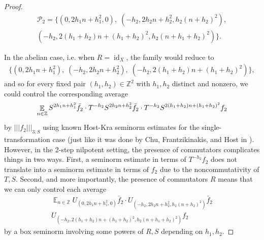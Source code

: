 \documentclass[11pt]{amsart}
\theoremstyle{definition}
\DeclareMathOperator*{\E}{\mathbb{E}}
\newcommand{\Z}{{\mathbb Z}}
\newcommand{\CP}{{\mathcal P}}
\newcommand{\nnorm}[1]{\lvert\!|\!| #1|\!|\!\rvert}
\newcommand{\1}{{\mathbf{1}}}
\DeclareMathOperator{\Id}{id}
\begin{document}
\begin{proof}
    \begin{multline*}
        \CP_2 = \{(0, 2h_1 n +h_1^2,0),\; (-h_2,2h_2 n +h_2^2,h_2(n+h_2)^2),\\ (-h_2, 2(h_1+h_2) n +(h_1+h_2)^2, h_2(n+h_1+h_2)^2)\}.
    \end{multline*}

    In the abelian case, i.e. when $R=\Id_X$, the family would reduce to
    \begin{align*}
        \{(0, 2h_1 n +h_1^2),\; (-h_2,2h_2 n +h_2^2),\; (-h_2, 2(h_1+h_2) n +(h_1+h_2)^2)\},
    \end{align*}
    and so for every fixed pair $(h_1,h_2)\in\Z^2$ with $h_1, h_2$ distinct and nonzero, we could control the corresponding average
    \begin{align*}
        \E_{n\in\Z}S^{2h_1 n +h_1^2}\bar f_2\cdot T^{-h_2}S^{2h_2 n +h_2^2}\bar f_2\cdot  T^{-h_2}S^{ 2(h_1+h_2) n +(h_1+h_2)^2}f_2\vphantom{\E_{n\in[N]}}
    \end{align*}
    by $\nnorm{f_2}_{3,S}$ using known Host-Kra seminorm estimates for the single-transformation case (just like it was done by Chu, Frantzikinakis, and Host in \cite{CFH11}).
    However, in the 2-step nilpotent setting, the presence of commutators complicates things in two ways. First, a seminorm estimate in terms of $T^{-h_2}f_2$ does not translate into a seminorm estimate in terms of $f_2$ due to the noncommutativity of $T,S$. Second, and more importantly, the presence of commutators $R$ means that we can only control each average 
    \begin{multline}\label{E: average over h_1, h_2}
        \E_{n\in\Z}U_{(0, 2h_1 n +h_1^2,0)}\bar f_2\cdot U_{(-h_2,2h_2 n +h_2^2,h_2(n+h_2)^2)}\bar f_2\\
        U_{(-h_2, 2(h_1+h_2) n +(h_1+h_2)^2, h_2(n+h_1+h_2)^2)}f_2
    \end{multline}
    by a box seminorm involving some powers of $R, S$ depending on $h_1, h_2$. 


\end{proof}
\end{document}
